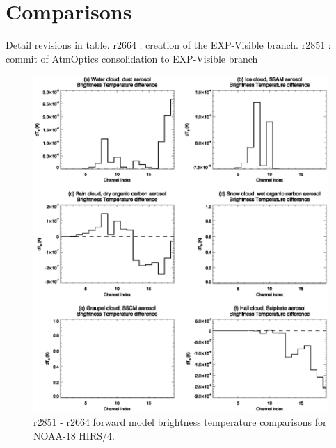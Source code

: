 \section{Comparisons}

Detail revisions in table.
r2664 : creation of the EXP-Visible branch.
r2851 : commit of AtmOptics consolidation to EXP-Visible branch

\begin{figure}[htb]
  \centering
  \includegraphics[scale=1.0]{graphics/hirs4_n18.eps}
  \caption{r2851 - r2664 forward model brightness temperature comparisons for NOAA-18 HIRS/4.}
  \label{fig:hirs4_n18}
\end{figure}

